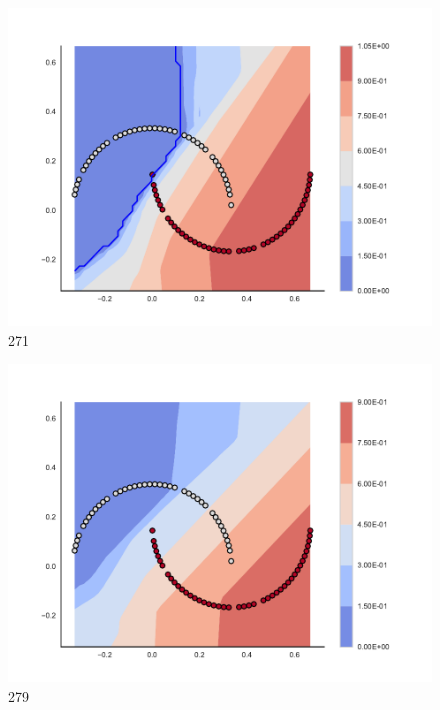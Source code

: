 \begin{subfigure}[b]{0.09\textwidth}
    \includegraphics[clip, trim=2.35cm 1.75cm 4.5cm 0cm,width=\textwidth]{img/convergence/271.pdf}
    \caption{271}
    \label{fig:convergence_271}
\end{subfigure}
%
\begin{subfigure}[b]{0.09\textwidth}
    \includegraphics[clip, trim=2.35cm 1.75cm 4.5cm 0cm,width=\textwidth]{img/convergence/279.pdf}
    \caption{279}
    \label{fig:convergence_279}
\end{subfigure}
%
